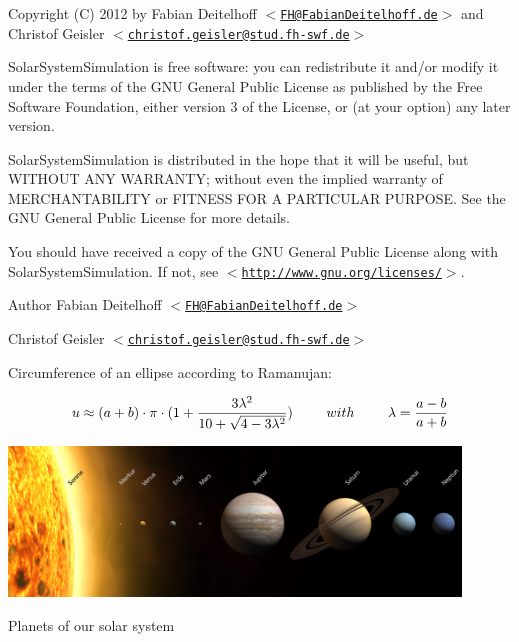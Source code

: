 \-Copyright (\-C) 2012 by \-Fabian \-Deitelhoff $<$\href{mailto:FH@FabianDeitelhoff.de}{\tt \-F\-H@\-Fabian\-Deitelhoff.\-de}$>$ and \-Christof \-Geisler $<$\href{mailto:christof.geisler@stud.fh-swf.de}{\tt christof.\-geisler@stud.\-fh-\/swf.\-de}$>$

\-Solar\-System\-Simulation is free software\-: you can redistribute it and/or modify it under the terms of the \-G\-N\-U \-General \-Public \-License as published by the \-Free \-Software \-Foundation, either version 3 of the \-License, or (at your option) any later version.

\-Solar\-System\-Simulation is distributed in the hope that it will be useful, but \-W\-I\-T\-H\-O\-U\-T \-A\-N\-Y \-W\-A\-R\-R\-A\-N\-T\-Y; without even the implied warranty of \-M\-E\-R\-C\-H\-A\-N\-T\-A\-B\-I\-L\-I\-T\-Y or \-F\-I\-T\-N\-E\-S\-S \-F\-O\-R \-A \-P\-A\-R\-T\-I\-C\-U\-L\-A\-R \-P\-U\-R\-P\-O\-S\-E. \-See the \-G\-N\-U \-General \-Public \-License for more details.

\-You should have received a copy of the \-G\-N\-U \-General \-Public \-License along with \-Solar\-System\-Simulation. \-If not, see $<$\href{http://www.gnu.org/licenses/}{\tt http\-://www.\-gnu.\-org/licenses/}$>$.

\begin{DoxyAuthor}{\-Author}
\-Fabian \-Deitelhoff $<$\href{mailto:FH@FabianDeitelhoff.de}{\tt \-F\-H@\-Fabian\-Deitelhoff.\-de}$>$ 

\-Christof \-Geisler $<$\href{mailto:christof.geisler@stud.fh-swf.de}{\tt christof.\-geisler@stud.\-fh-\/swf.\-de}$>$
\end{DoxyAuthor}
\-Circumference of an ellipse according to \-Ramanujan\-:

\[ u \approx (a + b) \cdot \pi \cdot ( 1 + \frac{ 3 \lambda^2}{10 + \sqrt{4 - 3 \lambda^2}}) \quad \hspace{0.5cm} with \hspace{0.5cm} \quad \lambda = \frac{a-b}{a+b} \]

 
\begin{DoxyImage}
\includegraphics[width=12cm]{about.jpg}
\caption{\-Planets of our solar system}
\end{DoxyImage}
 